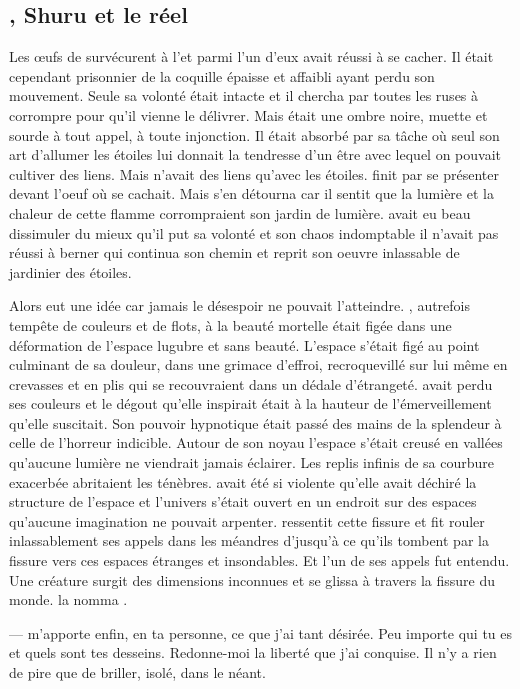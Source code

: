 \subsection{\Ogo, Shuru et le réel}

Les œufs de \Tot survécurent à l'\Extinction et parmi l'un d'eux \Ogo avait réussi à se cacher. Il était cependant prisonnier de la coquille épaisse et affaibli ayant perdu son mouvement. Seule sa volonté était intacte et il chercha par toutes les ruses à corrompre \Carac pour qu'il vienne le délivrer. Mais \Carac était une ombre noire, muette et sourde à tout appel, à toute injonction. Il était absorbé par sa tâche où seul son art d'allumer les étoiles lui donnait la tendresse d'un être avec lequel on pouvait cultiver des liens. Mais \Carac n'avait des liens qu'avec les étoiles. \Carac finit par se présenter devant l'oeuf où \Ogo se cachait. Mais \Carac s'en détourna car il sentit que la lumière et la chaleur de cette flamme corrompraient son jardin de lumière. \Ogo avait eu beau dissimuler du mieux qu'il put sa volonté et son chaos indomptable il n'avait pas réussi à berner \Carac qui continua son chemin et reprit son oeuvre inlassable de jardinier des étoiles. 

Alors \Ogo eut une idée car jamais le désespoir ne pouvait l'atteindre. \Auga, autrefois tempête de couleurs et de flots, à la beauté mortelle était figée dans une déformation de l'espace lugubre et sans beauté. L'espace s'était figé au point culminant de sa douleur, dans une grimace d'effroi, recroquevillé sur lui même en crevasses et en plis qui se recouvraient dans un dédale d'étrangeté. \Auga avait perdu ses couleurs et le dégout qu'elle inspirait était à la hauteur de l'émerveillement qu'elle suscitait. Son pouvoir hypnotique était passé des mains de la splendeur à celle de l'horreur indicible. Autour de son noyau l'espace s'était creusé en vallées qu'aucune lumière ne viendrait jamais éclairer. Les replis infinis de sa courbure exacerbée abritaient les ténèbres. \Auga avait été si violente qu'elle avait déchiré la structure de l'espace et l'univers s'était ouvert en un endroit sur des espaces qu'aucune imagination ne pouvait arpenter. \Ogo ressentit cette fissure et fit rouler inlassablement ses appels dans les méandres d'\Auga jusqu'à ce qu'ils tombent par la fissure vers ces espaces étranges et insondables. Et l'un de ses appels fut entendu. Une créature surgit des dimensions inconnues et se glissa à travers la fissure du monde. \Ogo la nomma \Shuru.

--- \Auga m'apporte enfin, en ta personne, ce que j'ai tant désirée. Peu importe qui tu es et quels sont tes desseins. Redonne-moi la liberté que j'ai conquise. Il n'y a rien de pire que de briller, isolé, dans le néant. \n

